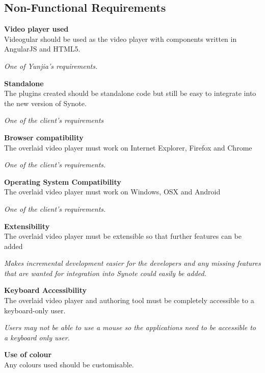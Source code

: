 \subsection{Non-Functional Requirements}
\begin{requirement}[label=\textbf{N\arabic*}]
\item \textbf{Video player used} \label{Req:Video player used} \hfill \\ Videogular should be used as the video player with components written in AngularJS and HTML5.

\textit{One of Yunjia's requirements.}
\item \textbf{Standalone} \label{Req:Standalone} \hfill \\ The plugins created should be standalone code but still be easy to integrate into the new version of Synote.

\textit{One of the client's requirements}
\item \textbf{Browser compatibility} \label{Req:Browser compatibility} \hfill \\ The overlaid video player must work on Internet Explorer, Firefox and Chrome 

\textit{One of the client's requirements.}
\item \textbf{Operating System Compatibility} \label{Req:OS compatibility} \hfill \\ The overlaid video player must work on Windows, OSX and Android 

\textit{One of the client's requirements.}
\item \textbf{Extensibility} \label{Req:Extensibility} \hfill \\ The overlaid video player must be extensible so that further features can be added 

\textit{Makes incremental development easier for the developers and any missing features that are wanted for integration into Synote could easily be added.}
\item \textbf{Keyboard Accessibility}\label{Req:Keyboard accessibility} \hfill \\ The overlaid video player and authoring tool must be completely accessible to a keyboard-only user.

\textit{Users may not be able to use a mouse so the applications need to be accessible to a keyboard only user.}
\item \textbf{Use of colour}\label{Req:Use of colour} \hfill \\ Any colours used should be customisable.


\end{requirement}
